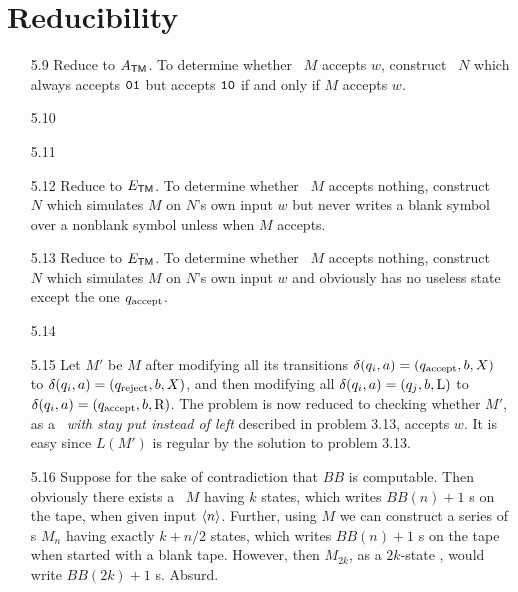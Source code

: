 \section{Reducibility}

\begin{itemize}
	
	\item[5.9]
	Reduce to $A_{\TM}$. To determine whether \TM\ $M$ accepts $w$, construct \TM\ $N$ which always accepts $\TT{01}$ but accepts $\TT{10}$ if and only if $M$ accepts $w$.
	
	\item[5.10]
	\Omit
	
	\item[5.11]
	\Omit
	
	\item[5.12]
	Reduce to $E_{\TM}$. To determine whether \TM\ $M$ accepts nothing, construct \TM\ $N$ which simulates $M$ on $N$'s own input $w$ but never writes a blank symbol over a nonblank symbol unless when $M$ accepts.
	
	\item[5.13]
	Reduce to $E_{\TM}$. To determine whether \TM\ $M$ accepts nothing, construct \TM\ $N$ which simulates $M$ on $N$'s own input $w$ and obviously has no useless state except the one $q_{\RM{accept}}$.
	
	\item[5.14]
	\Empty
	
	\item[5.15]
	Let $M'$ be $M$ after modifying all its transitions $\delta(q_i,a) = (q_{\RM{accept}},b,X)$ to $\delta(q_i,a) = (q_{\RM{reject}},b,X)$, and then modifying all $\delta(q_i,a) = (q_j,b,\RM{L})$ to $\delta(q_i,a) = (q_{\RM{accept}},b,\RM{R})$. The problem is now reduced to checking whether $M'$, as a \emph{\TM\ with stay put instead of left} described in problem 3.13, accepts $w$. It is easy since $L(M')$ is regular by the solution to problem 3.13.
	
	\item[5.16]
	Suppose for the sake of contradiction that $BB$ is computable. Then obviously there exists a \TM\ $M$ having $k$ states, which writes $BB(n) + 1$ s on the tape, when given input $\Bra{n}$. Further, using $M$ we can construct a series of \TM s $M_n$ having exactly $k+n/2$ states, which writes $BB(n) + 1$ s on the tape when started with a blank tape. However, then $M_{2k}$, as a $2k$-state \TM , would write $BB(2k) + 1$ s. Absurd.
	

\end{itemize}
